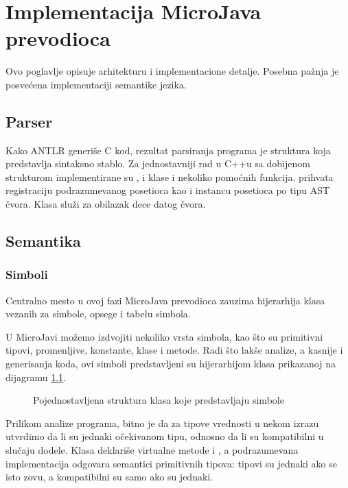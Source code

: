 \chapter{Implementacija MicroJava prevodioca}
\label{ch:implementacija}

Ovo poglavlje opisuje arhitekturu i implementacione detalje. Posebna pažnja je posvećena implementaciji semantike jezika.

\section{Parser}

Kako ANTLR generiše C kod, rezultat parsiranja programa je struktura koja predstavlja sintaksno stablo.
Za jednostavniji rad  u C++u sa dobijenom strukturom implementirane su
,  i  klase i nekoliko pomoćnih funkcija.  prihvata registraciju podrazumevanog posetioca kao i instancu posetioca po tipu AST čvora.
Klasa  služi za obilazak dece datog čvora.

\section{Semantika}

\subsection*{Simboli}

Centralno mesto u ovoj fazi MicroJava prevodioca zauzima hijerarhija klasa vezanih za simbole, opsege i tabelu simbola.

U MicroJavi možemo izdvojiti nekoliko vrsta simbola, kao što su primitivni tipovi, promenljive, konstante, klase i metode.
Radi što lakše analize, a kasnije i generisanja koda, ovi simboli predstavljeni su hijerarhijom klasa prikazanoj na dijagramu \ref{fig:symbols}.

\begin{figure}[h]

	\centering
	
	\caption{Pojednostavljena struktura klasa koje predstavljaju simbole}
	\label{fig:symbols}
\end{figure}

Prilikom analize programa, bitno je da za tipove vrednosti u nekom izrazu utvrdimo da li su jednaki očekivanom tipu, odnosno da li su kompatibilni u slučaju dodele.
Klasa  deklariše virtualne metode  i , a podrazumevana implementacija odgovara semantici primitivnih tipova: tipovi su jednaki ako se isto zovu, a kompatibilni su samo ako su jednaki.

